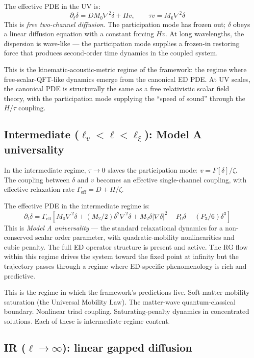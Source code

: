 \documentclass[11pt,a4paper]{article}
\begin{document}
The effective PDE in the UV is:
\[
\partial_t \delta = D M_0 \nabla^{2}\delta + H v, \qquad \tau \dot v = M_0 \nabla^{2}\delta
\]
This is \emph{free two-channel diffusion}. The participation mode has frozen out; $\delta$ obeys a linear diffusion equation with a constant forcing $Hv$. At long wavelengths, the dispersion is wave-like --- the participation mode supplies a frozen-in restoring force that produces second-order time dynamics in the coupled system.

This is the kinematic-acoustic-metric regime of the framework: the regime where free-scalar-QFT-like dynamics emerge from the canonical ED PDE. At UV scales, the canonical PDE is structurally the same as a free relativistic scalar field theory, with the participation mode supplying the ``speed of sound'' through the $H/\tau$ coupling.

\subsection{Intermediate ($\ell_v < \ell < \ell_\xi$): Model A universality}

In the intermediate regime, $\tau \to 0$ slaves the participation mode: $v = F[\delta]/\zeta$. The coupling between $\delta$ and $v$ becomes an effective single-channel coupling, with effective relaxation rate $\Gamma_\mathrm{eff} = D + H/\zeta$.

The effective PDE in the intermediate regime is:
\[
\partial_t \delta = \Gamma_{\mathrm{eff}} \left[ M_0 \nabla^{2}\delta + (M_2/2) \delta^{2} \nabla^{2}\delta + M_2 \delta|\nabla \delta|^{2} - P_0 \delta - (P_3/6) \delta^{3} \right]
\]
This is \emph{Model A universality} --- the standard relaxational dynamics for a non-conserved scalar order parameter, with quadratic-mobility nonlinearities and cubic penalty. The full ED operator structure is present and active. The RG flow within this regime drives the system toward the fixed point at infinity but the trajectory passes through a regime where ED-specific phenomenology is rich and predictive.

This is the regime in which the framework's predictions live. Soft-matter mobility saturation (the Universal Mobility Law). The matter-wave quantum-classical boundary. Nonlinear triad coupling. Saturating-penalty dynamics in concentrated solutions. Each of these is intermediate-regime content.

\subsection{IR ($\ell \to \infty$): linear gapped diffusion}
\end{document}
